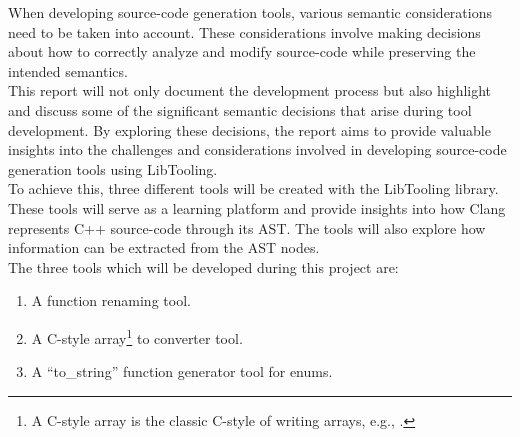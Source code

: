 When developing source-code generation tools, various semantic considerations need to be taken into account.
These considerations involve making decisions about how to correctly analyze and modify source-code while preserving the intended semantics.\\
This report will not only document the development process but also highlight and discuss some of the significant semantic decisions that arise during tool development.
By exploring these decisions, the report aims to provide valuable insights into the challenges and considerations involved in developing source-code generation tools using LibTooling.\\
To achieve this, three different tools will be created with the LibTooling library.
These tools will serve as a learning platform and provide insights into how Clang represents C++ source-code through its AST. The tools will also explore how information can be extracted from the AST nodes.\\
The three tools which will be developed during this project are:
\vspace*{-0.75em}
\begin{enumerate}
    \item A function renaming tool.
    \item A C-style array\footnote{A C-style array is the classic C-style of writing arrays, e.g., .} to  converter tool.
    \item A ``to\_string'' function generator tool for enums.
\end{enumerate}